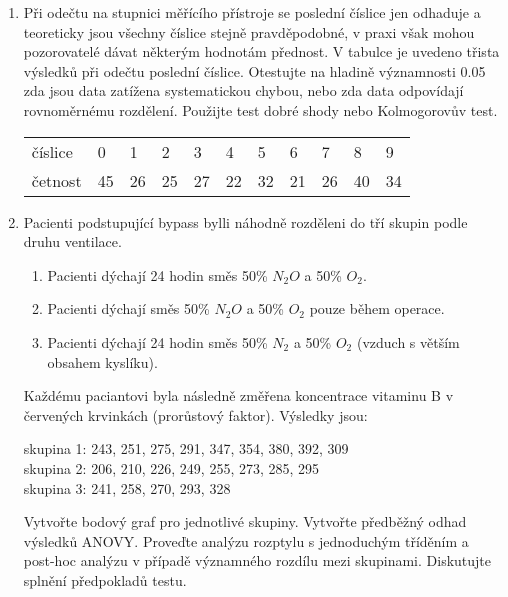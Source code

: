 \documentclass[a4paper,12pt]{article}
\begin{document}
\begin{enumerate}
  
  \item  Při odečtu na stupnici měřícího přístroje se poslední číslice jen odhaduje a 
  teoreticky jsou všechny číslice stejně pravděpodobné, v praxi však mohou pozorovatelé 
  dávat některým hodnotám přednost. V tabulce je uvedeno třista výsledků při odečtu poslední číslice. 
  Otestujte na hladině významnosti 0.05 zda jsou data zatížena systematickou chybou, nebo zda 
  data odpovídají rovnoměrnému rozdělení. Použijte test dobré shody nebo Kolmogorovův test.

\begin{center}
\begin{tabular}{lllllllllll}
číslice &0 &1 &2 &3 &4 &5 &6 &7 &8 &9\\
četnost &45 &26 &25 &27 &22 &32 &21 &26 &40 &34 
\end{tabular}
\end{center}

 
  \item Pacienti podstupující bypass bylli náhodně rozděleni do tří skupin podle druhu ventilace.
  \begin{enumerate}
    \item Pacienti dýchají 24 hodin směs 50\% $N_2O$ a 50\% $O_2$.
    \item Pacienti dýchají směs 50\% $N_2O$ a 50\% $O_2$ pouze během operace.
    \item Pacienti dýchají 24 hodin směs 50\% $N_2$ a 50\% $O_2$ (vzduch s větším obsahem kyslíku). 
  \end{enumerate}
  Každému paciantovi byla následně změřena koncentrace vitaminu B v červených krvinkách (prorůstový faktor). Výsledky jsou:
  
  skupina 1: 243, 251, 275, 291, 347, 354, 380, 392, 309\\
  skupina 2: 206, 210, 226, 249, 255, 273, 285, 295\\
  skupina 3: 241, 258, 270, 293, 328
  
  Vytvořte bodový graf pro jednotlivé skupiny. Vytvořte předběžný odhad výsledků ANOVY.
  Proveďte analýzu rozptylu s jednoduchým tříděním a post-hoc analýzu 
  v případě významného rozdílu mezi skupinami.  Diskutujte splnění předpokladů testu.
\end{enumerate}
\end{document}
